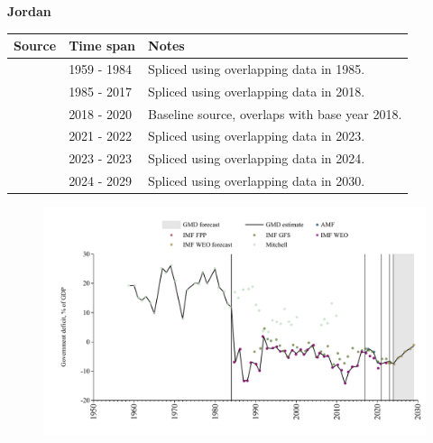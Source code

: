 \documentclass[12pt,a4paper,landscape]{article}
\begin{document}
\begin{adjustbox}{max totalsize={\paperwidth}{\paperheight},center}
\begin{minipage}[t][\textheight][t]{\textwidth}
\vspace*{0.5cm}
{}
\begin{center}
{\Large\bfseries Jordan}
\end{center}
\vspace{0.5cm}
\begin{table}[H]
\centering
\small
\begin{tabular}{|l|l|l|}
\hline
\textbf{Source} & \textbf{Time span} & \textbf{Notes} \\
\hline
\rowcolor{white}\cite{Mitchell}& 1959 - 1984 &Spliced using overlapping data in 1985.\\
\rowcolor{lightgray}\cite{IMF_WEO}& 1985 - 2017 &Spliced using overlapping data in 2018.\\
\rowcolor{white}\cite{AMF}& 2018 - 2020 &Baseline source, overlaps with base year 2018.\\
\rowcolor{lightgray}\cite{IMF_WEO}& 2021 - 2022 &Spliced using overlapping data in 2023.\\
\rowcolor{white}\cite{IMF_GFS}& 2023 - 2023 &Spliced using overlapping data in 2024.\\
\rowcolor{lightgray}\cite{IMF_WEO_forecast}& 2024 - 2029 &Spliced using overlapping data in 2030.\\
\hline
\end{tabular}
\end{table}
\begin{figure}[H]
\centering
\includegraphics[width=\textwidth,height=0.6\textheight,keepaspectratio]{graphs/JOR_govdef_GDP.pdf}
\end{figure}
\end{minipage}
\end{adjustbox}
\end{document}
